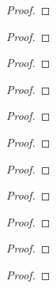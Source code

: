 \begin{exercise}
\end{exercise}
\begin{proof}
\end{proof}

\begin{exercise}
\end{exercise}
\begin{proof}
\end{proof}

\begin{exercise}
\end{exercise}
\begin{proof}
\end{proof}

\begin{exercise}
\end{exercise}
\begin{proof}
\end{proof}

\begin{exercise}
\end{exercise}
\begin{proof}
\end{proof}

\begin{exercise}
\end{exercise}
\begin{proof}
\end{proof}

\begin{exercise}
\end{exercise}
\begin{proof}
\end{proof}

\begin{exercise}
\end{exercise}
\begin{proof}
\end{proof}

\begin{exercise}
\end{exercise}
\begin{proof}
\end{proof}

\begin{exercise}
\end{exercise}
\begin{proof}
\end{proof}

\begin{exercise}
\end{exercise}
\begin{proof}
\end{proof}

